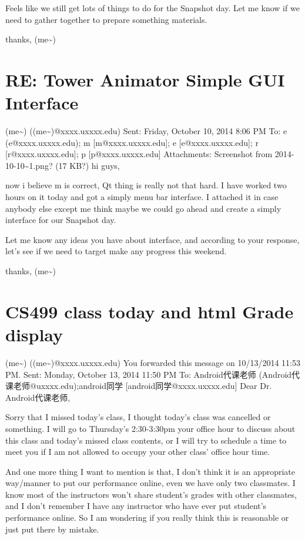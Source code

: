 \documentclass[12pt]{book}
\begin{document}
Feels like we still get lots of things to do for the Snapshot day. Let me know if we need to gather together to prepare something materials.

thanks,
(me\textasciitilde{})

\section{RE: Tower Animator \textunderscore Simple GUI Interface}
\label{sec-14-4}
(me\textasciitilde{}) ((me\textasciitilde{})@xxxx.uxxxx.edu)
Sent:        Friday, October 10, 2014 8:06 PM
To:        
e (e@xxxx.uxxxx.edu); m [m@xxxx.uxxxx.edu]; e [e@xxxx.uxxxx.edu]; r [r@xxxx.uxxxx.edu]; p [p@xxxx.uxxxx.edu]
Attachments:        
Screenshot from 2014-10-10\textasciitilde{}1.png? (17 KB?)
hi guys, 

now i believe m is correct, Qt thing is really not that hard. I have worked two hours on it today and got a simply menu bar interface. 
I attached it in case anybody else except me think maybe we could go ahead and create a simply interface for our Snapshot day. 

Let me know any ideas you have about interface, and according to your response, let's see if we need to target make any progress this weekend. 

thanks,
(me\textasciitilde{})

\section{CS499 class today and html Grade display}
\label{sec-14-5}
(me\textasciitilde{}) ((me\textasciitilde{})@xxxx.uxxxx.edu)
You forwarded this message on 10/13/2014 11:53 PM.
Sent:        Monday, October 13, 2014 11:50 PM
To:        
Android代课老师 (Android代课老师@uxxxx.edu);android同学 [android同学@xxxx.uxxxx.edu]
Dear Dr. Android代课老师, 

Sorry that I missed today's class, I thought today's class was cancelled or something. I will go to Thursday's 2:30-3:30pm your office hour to discuss about this class and today's missed class contents, or I will try to schedule a time to meet you if I am not allowed to occupy your other class' office hour time. 

And one more thing I want to mention is that, I don't think it is an appropriate way/manner to put our performance online, even we have only two classmates. I know most of the instructors won't share student's grades with other classmates, and I don't remember I have any instructor who have ever put student's performance online. So I am wondering if you really think this is reasonable or just put there by mistake. 
\end{document}
